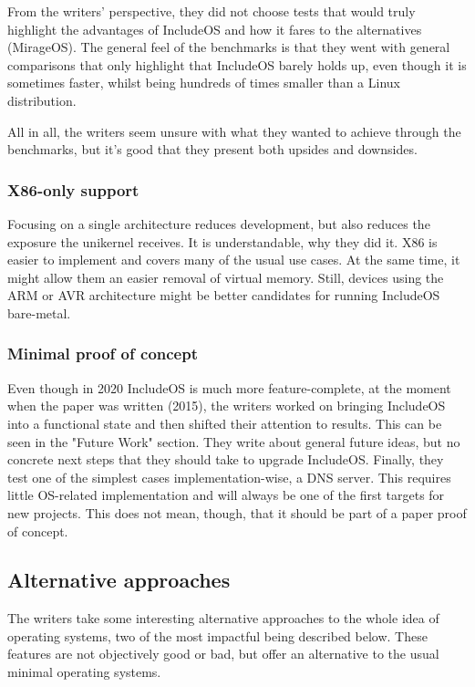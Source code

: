 \documentclass[12pt]{article}
\begin{document}
From the writers' perspective, they did not choose tests that would truly highlight the advantages of IncludeOS and how it fares to the
alternatives (MirageOS). The general feel of the benchmarks is that they went with general comparisons that only highlight that IncludeOS
barely holds up, even though it is sometimes faster, whilst being hundreds of times smaller than a Linux distribution.

All in all, the writers seem unsure with what they wanted to achieve through the benchmarks, but it's good that they present both upsides
and downsides.

\subsubsection{X86-only support}
Focusing on a single architecture reduces development, but also reduces the exposure the unikernel receives. It is understandable, why
they did it. X86 is easier to implement and covers many of the usual use cases. At the same time, it might allow them an easier removal
of virtual memory. Still, devices using the ARM or AVR architecture might be better candidates for running IncludeOS bare-metal.

\subsubsection{Minimal proof of concept}
Even though in 2020 IncludeOS is much more feature-complete, at the moment when the paper was written (2015), the writers worked on
bringing IncludeOS into a functional state and then shifted their attention to results. This can be seen in the "Future Work" section.
They write about general future ideas, but no concrete next steps that they should take to upgrade IncludeOS. Finally, they test one of
the simplest cases implementation-wise, a DNS server. This requires little OS-related implementation and will always be one of the first
targets for new projects. This does not mean, though, that it should be part of a paper proof of concept.

\subsection{Alternative approaches}
The writers take some interesting alternative approaches to the whole idea of operating systems, two of the most impactful being described
below. These features are not objectively good or bad, but offer an alternative to the usual minimal operating systems.
\end{document}
